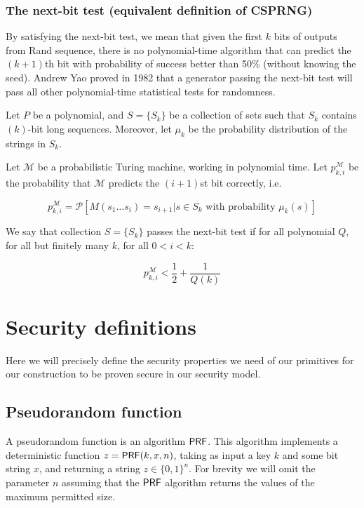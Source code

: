 \documentclass{article}
\begin{document}
\subsubsection*{The next-bit test (equivalent definition of CSPRNG)}
By satisfying the next-bit test, we mean that given the first $k$ bits of outputs from Rand sequence, there is no polynomial-time algorithm that can predict the $(k+1)$th bit with probability of success better than 50\% (without knowing the seed). Andrew Yao proved in 1982 that a generator passing the next-bit test will pass all other polynomial-time statistical tests for randomness.

Let $P$ be a polynomial, and $S=\{S_k\}$ be a collection of sets such that $S_k$ contains $(k)$-bit long sequences. Moreover, let $\mu_k$ be the probability distribution of the strings in $S_k$.

Let $\mathcal{M}$ be a probabilistic Turing machine, working in polynomial time. Let $p_{k,i}^{\mathcal{M}}$ be the probability that $\mathcal{M}$ predicts the $(i+1)$st bit correctly, i.e.

$$p_{k,i}^{\mathcal{M}}={\mathcal{P}}[M(s_1\ldots s_i)=s_{i+1} | s\in S_k\text{ with probability }\mu_k(s)]$$

We say that collection $S = \{ S_k \}$ passes the next-bit test if for all polynomial $Q$, for all but finitely many $k$, for all $0 < i < k$: 

$$
p_{k,i}^{\mathcal M}<\frac{1}{2}+\frac{1}{Q(k)}
$$

\section{Security definitions} \label{sec:def}

Here we will precisely define the security properties we need of our primitives for our construction to be proven secure in our security model.

\subsection{Pseudorandom function} \label{PRFdef}


A pseudorandom function is an algorithm $\mathsf{PRF}$. This algorithm implements a deterministic function $z=\mathsf{PRF}(k, x, n)$, taking as input a key $k$ and some bit string $x$, and returning a string $z \in \{0, 1 \}^{n}$. For brevity we will omit the parameter $n$ assuming that the $\mathsf{PRF}$ algorithm returns the values of the maximum permitted size.
\end{document}
